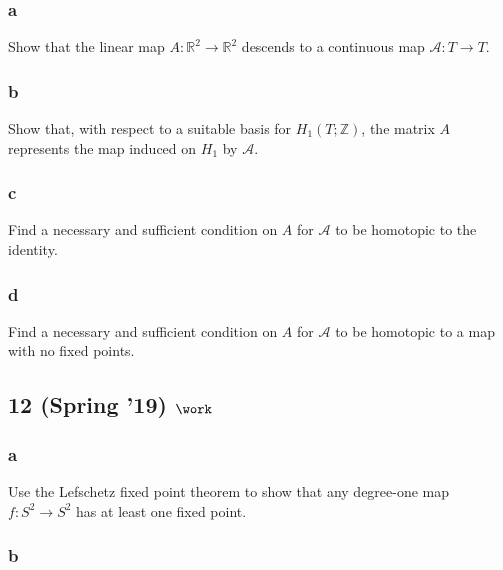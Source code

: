 \hypertarget{a-6}{%
\subsubsection{a}\label{a-6}}

Show that the linear map \(A : {\mathbb{R}}^2 \to {\mathbb{R}}^2\)
descends to a continuous map \({\mathcal{A}}: T \to T\).

\hypertarget{b-6}{%
\subsubsection{b}\label{b-6}}

Show that, with respect to a suitable basis for
\(H_1 (T ; {\mathbb{Z}})\), the matrix \(A\) represents the map induced
on \(H_1\) by \({\mathcal{A}}\).

\hypertarget{c-2}{%
\subsubsection{c}\label{c-2}}

Find a necessary and sufficient condition on \(A\) for \({\mathcal{A}}\)
to be homotopic to the identity.

\hypertarget{d}{%
\subsubsection{d}\label{d}}

Find a necessary and sufficient condition on \(A\) for \({\mathcal{A}}\)
to be homotopic to a map with no fixed points.

\hypertarget{spring-19-work-3}{%
\subsection{\texorpdfstring{12 (Spring '19)
\(\work\)}{12 (Spring '19) \textbackslash work}}\label{spring-19-work-3}}

\hypertarget{a-7}{%
\subsubsection{a}\label{a-7}}

Use the Lefschetz fixed point theorem to show that any degree-one map
\(f : S^2 \to S^2\) has at least one fixed point.

\hypertarget{b-7}{%
\subsubsection{b}\label{b-7}}

